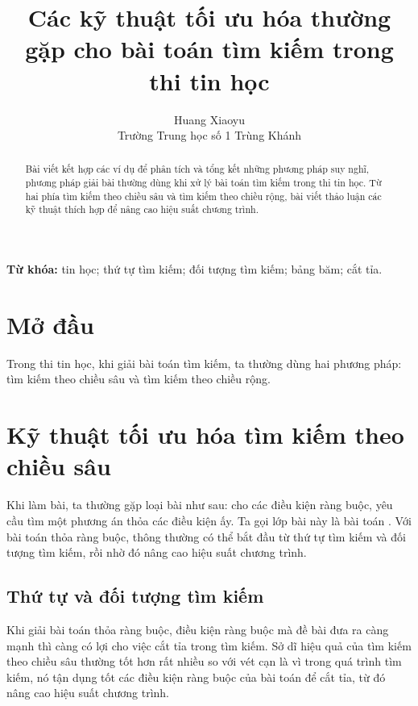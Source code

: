 \documentclass[11pt]{article}
\title{Các kỹ thuật tối ưu hóa thường gặp cho bài toán tìm kiếm trong thi tin học}
\author{Huang Xiaoyu \\ Trường Trung học số 1 Trùng Khánh}
\date{}
\begin{document}
\maketitle


\begin{abstract}
Bài viết kết hợp các ví dụ để phân tích và tổng kết những phương pháp suy
nghĩ, phương pháp giải bài thường dùng khi xử lý bài toán tìm kiếm trong thi
tin học. Từ hai phía tìm kiếm theo chiều sâu và tìm kiếm theo chiều rộng, bài
viết thảo luận các kỹ thuật thích hợp để nâng cao hiệu suất chương trình.
\end{abstract}

\noindent\textbf{Từ khóa:} tin học; thứ tự tìm kiếm; đối tượng tìm kiếm; bảng
băm; cắt tỉa.

\section{Mở đầu}

Trong thi tin học, khi giải bài toán tìm kiếm, ta thường dùng hai phương pháp:
tìm kiếm theo chiều sâu và tìm kiếm theo chiều rộng.

\section{Kỹ thuật tối ưu hóa tìm kiếm theo chiều sâu}

Khi làm bài, ta thường gặp loại bài như sau: cho các điều kiện ràng buộc, yêu
cầu tìm một phương án thỏa các điều kiện ấy. Ta gọi lớp bài này là bài toán
. Với bài toán thỏa ràng buộc, thông thường có thể bắt
đầu từ thứ tự tìm kiếm và đối tượng tìm kiếm, rồi nhờ đó nâng cao hiệu suất
chương trình.

\subsection{Thứ tự và đối tượng tìm kiếm}

Khi giải bài toán thỏa ràng buộc, điều kiện ràng buộc mà đề bài đưa ra càng
mạnh thì càng có lợi cho việc cắt tỉa trong tìm kiếm. Sở dĩ hiệu quả của tìm
kiếm theo chiều sâu thường tốt hơn rất nhiều so với vét cạn là vì trong quá
trình tìm kiếm, nó tận dụng tốt các điều kiện ràng buộc của bài toán để cắt
tỉa, từ đó nâng cao hiệu suất chương trình.
\end{document}
